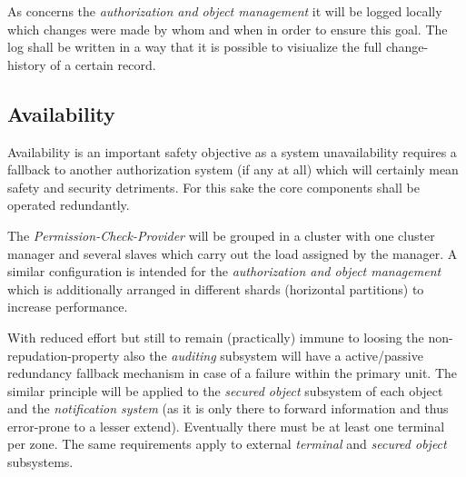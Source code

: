 \documentclass[12pt,a4paper,titlepage,oneside]{scrartcl}
\begin{document}
As concerns the \emph{authorization and object management} it will be logged locally which changes were made by whom and when in
order to ensure this goal. The log shall be written in a way that it is possible to visiualize the full change-history of a
certain record.


\subsection{Availability}
Availability is an important safety objective as a system unavailability requires a fallback to another authorization system (if any at all)
which will certainly mean safety and security detriments. For this sake the core components shall be operated redundantly.

The \emph{Permission-Check-Provider} will be grouped in a cluster with one cluster manager and several slaves which carry
out the load assigned by the manager. A similar configuration is intended for the \emph{authorization and object management} 
which is additionally arranged in different shards (horizontal partitions) to increase performance.

With reduced effort but still to remain (practically) immune to loosing the non-repudation-property also the \emph{auditing} subsystem
will have a active/passive redundancy fallback mechanism in case of a failure within the primary unit. The similar principle
will be applied to the \emph{secured object} subsystem of each object and the \emph{notification system} (as it is only there
to forward information and thus error-prone to a lesser extend). Eventually there must be at least one terminal per zone. The same
requirements apply to external \emph{terminal} and \emph{secured object} subsystems.

\begin{figure}[h]
    \centering
\end{figure}
\end{document}
